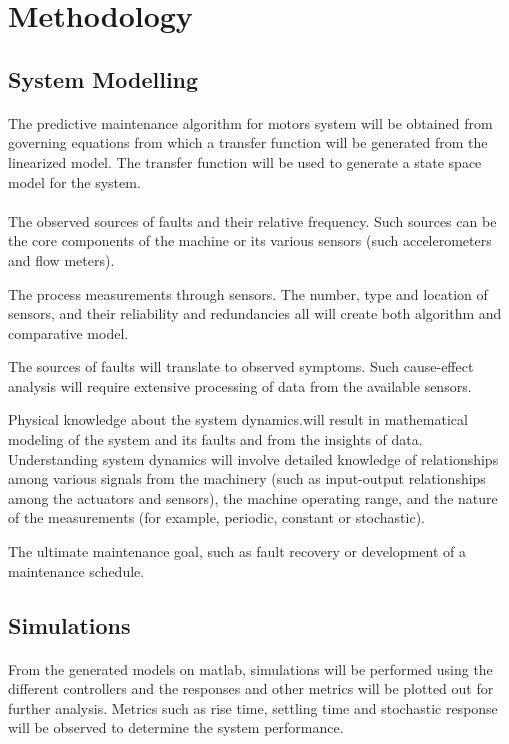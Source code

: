 \section{Methodology}
\subsection{System Modelling}
\paragraph{}The predictive maintenance algorithm for motors system  will be obtained from governing equations from which a transfer function will be generated from the linearized model. The transfer function will be used to generate a state space model for the system. 
\paragraph{}

The observed sources of faults and their relative frequency. Such sources can be the core components of the machine or its various sensors (such accelerometers and flow meters).

The process measurements through sensors. The number, type and location of sensors, and their reliability and redundancies all will create both algorithm and comparative model.

The sources of faults will  translate to observed symptoms. Such cause-effect analysis will require extensive processing of data from the available sensors.

Physical knowledge about the system dynamics.will result in mathematical modeling of the system and its faults and from the insights of data. Understanding system dynamics will involve detailed knowledge of relationships among various signals from the machinery (such as input-output relationships among the actuators and sensors), the machine operating range, and the nature of the measurements (for example, periodic, constant or stochastic).

The ultimate maintenance goal, such as fault recovery or development of a maintenance schedule.


\subsection{Simulations}
\paragraph{}From the generated models on matlab, simulations will be performed using the different controllers and the responses and other metrics will be plotted out for further analysis. Metrics such as rise time, settling time and stochastic response will be observed to determine the system performance.
